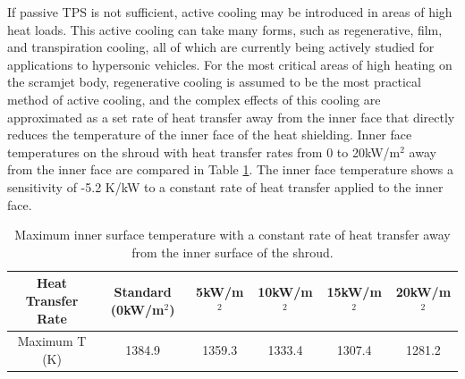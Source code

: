 If passive TPS is not sufficient, active cooling may be introduced in areas of high heat loads. This active cooling can take many forms, such as regenerative, film, and transpiration cooling\cite{Zhu2018}, all of which are currently being actively studied for applications to hypersonic vehicles. For the most critical areas of high heating on the scramjet body, regenerative cooling is assumed to be the most practical method of active cooling, and the complex effects of this cooling are approximated as a set rate of heat transfer away from the inner face that directly reduces the temperature of the inner face of the heat shielding. Inner face temperatures on the shroud with heat transfer rates from 0 to 20kW/m$^2$ away from the inner face are compared in Table \ref{tab:regenerativecooling}. The inner face temperature shows a sensitivity of -5.2 K/kW to a constant rate of heat transfer applied to the inner face. 
\begin{table}[ht]
	\centering
	\begin{tabular}{|c|c|c|c|c|c|}
		\hline Heat Transfer Rate & Standard (0kW/m$^2$) & 5kW/m$^2$ & 10kW/m$^2$ & 15kW/m$^2$ & 20kW/m$^2$ \\ 
		\hline Maximum T (K) & 1384.9 & 1359.3 & 1333.4 & 1307.4 & 1281.2 \\ 
		\hline
	\end{tabular}	
	\caption{Maximum inner surface temperature with a constant rate of heat transfer away from the inner surface of the shroud.}
	\label{tab:regenerativecooling}	
\end{table}

